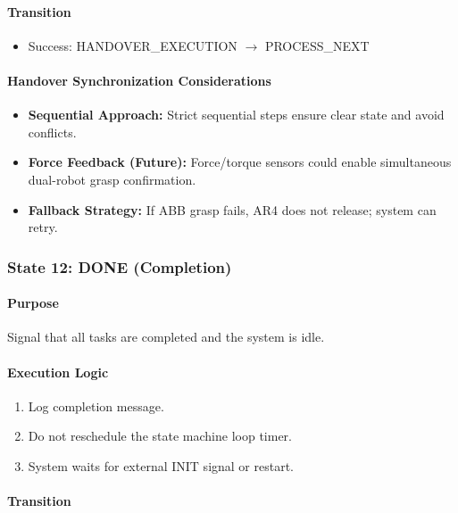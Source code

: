 \paragraph{Transition}

\begin{itemize}
    \item Success: HANDOVER\_EXECUTION $\rightarrow$ PROCESS\_NEXT
\end{itemize}

\paragraph{Handover Synchronization Considerations}

\begin{itemize}
    \item \textbf{Sequential Approach:} Strict sequential steps ensure clear state and avoid conflicts.
    \item \textbf{Force Feedback (Future):} Force/torque sensors could enable simultaneous dual-robot grasp confirmation.
    \item \textbf{Fallback Strategy:} If ABB grasp fails, AR4 does not release; system can retry.
\end{itemize}

\subsubsection{State 12: DONE (Completion)}
\label{state:done}

\paragraph{Purpose}

Signal that all tasks are completed and the system is idle.

\paragraph{Execution Logic}

\begin{enumerate}
    \item Log completion message.
    \item Do not reschedule the state machine loop timer.
    \item System waits for external INIT signal or restart.
\end{enumerate}

\paragraph{Transition}

